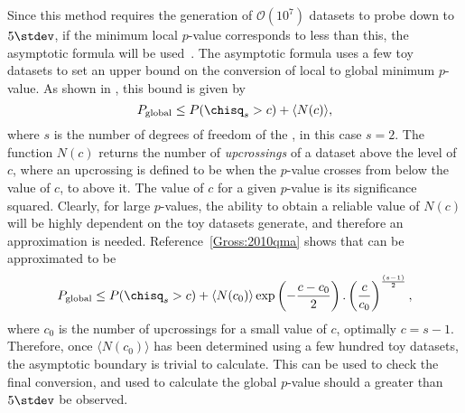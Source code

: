 Since this method requires the generation of $\mathcal{O}(10^7)$ datasets to probe down to
$5\stdev$, if the minimum local $p$-value corresponds to less than this, the asymptotic formula
will be used~\cite{Gross:2010qma}.
The asymptotic formula uses a few toy datasets to set an upper bound on the conversion of local to
global minimum $p$-value.
As shown in , this bound is given by
\begin{equation}
  P_\mathrm{global} \leq P(\chisq_s > c) + \langle N(c)\rangle,
  \label{eq:db:asy1}
\end{equation}
where $s$ is the number of degrees of freedom of the \chisq, in this case $s=2$.
The function $N(c)$ returns the number of \emph{upcrossings} of a dataset above the level of $c$,
where an upcrossing is defined to be when the $p$-value crosses from below the value of
$c$, to above it.
The value of $c$ for a given $p$-value is its significance squared.
Clearly, for large $p$-values, the ability to obtain a reliable value of $N(c)$ will be highly
dependent on the toy datasets generate, and therefore an approximation is needed.
Reference~\ref{Gross:2010qma} shows that  can be approximated to be
\begin{equation}
  P_\mathrm{global} \leq P(\chisq_s > c)
  + \langle N(c_0)\rangle
  \exp\left(-\frac{c-c_0}{2}\right).
  \left(\frac{c}{c_0}\right)^{\frac{(s-1)}{2}},
  \label{eq:db:asy2}
\end{equation}
where $c_0$ is the number of upcrossings for a small value of $c$, optimally $c=s-1$.
Therefore, once $\langle N(c_0)\rangle$ has been determined using a few hundred toy datasets, the
asymptotic boundary is trivial to calculate.
This can be used to check the final conversion, and used to calculate the global $p$-value should a
greater than $5\stdev$ be observed.


